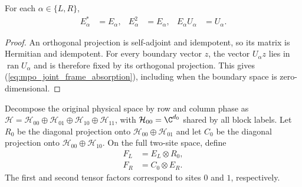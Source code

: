 \begin{theorem}
    \label{thm:mpo_joint_frame_projection_identities}
    For each $\alpha\in\{L,R\}$,
    \begin{align}
        E_\alpha^*        & =E_\alpha, & E_\alpha^2 & =E_\alpha, &
        E_\alpha U_\alpha & =U_\alpha.
        \label{eq:mpo_joint_frame_absorption}
    \end{align}
\end{theorem}
\begin{proof}
    An orthogonal projection is self-adjoint and idempotent, so its
    matrix is Hermitian and idempotent. For every boundary vector $z$,
    the vector $U_\alpha z$ lies in $\operatorname{ran}U_\alpha$ and
    is therefore fixed by its orthogonal projection. This gives
    (\ref{eq:mpo_joint_frame_absorption}), including when the boundary
    space is zero-dimensional.
\end{proof}

\begin{definition}
    \label{def:mpo_joint_one_sided_projections}
    Decompose the original physical space by row and column phase as
    $\mathcal H=\mathcal H_{00}\oplus\mathcal H_{01}
        \oplus\mathcal H_{10}\oplus\mathcal H_{11}$, with
    $\mathcal H_{00}=\C^{d_0}$ shared by all block labels.
    Let $R_0$ be the diagonal projection onto
    $\mathcal H_{00}\oplus\mathcal H_{01}$ and let $C_0$ be the
    diagonal projection onto $\mathcal H_{00}\oplus\mathcal H_{10}$.
    On the full two-site space, define
    \begin{align}
        F_L & =E_L\otimes R_0, \\
        F_R & =C_0\otimes E_R.
    \end{align}
    The first and second tensor factors correspond to sites $0$ and
    $1$, respectively.
\end{definition}

